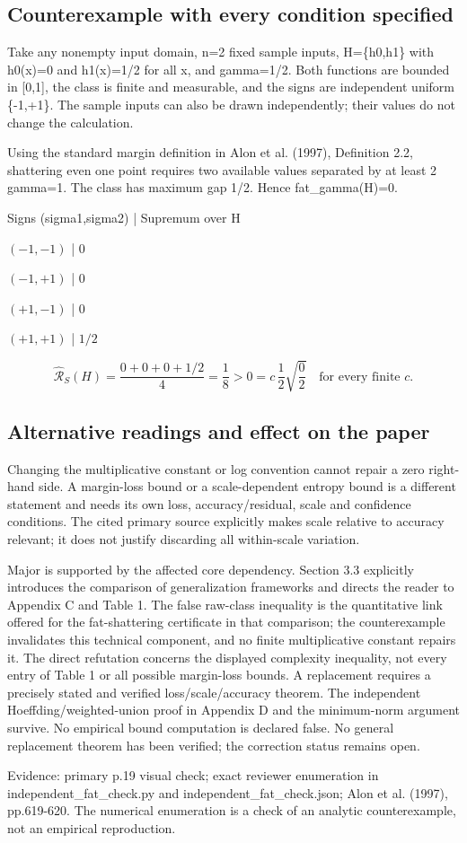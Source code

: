 \documentclass[10pt]{article}
\begin{document}
\subsection*{Counterexample with every condition specified}
Take any nonempty input domain, n=2 fixed sample inputs, H=\{h0,h1\} with h0(x)=0 and h1(x)=1/2 for all x, and gamma=1/2. Both functions are bounded in [0,1], the class is finite and measurable, and the signs are independent uniform \{-1,+1\}. The sample inputs can also be drawn independently; their values do not change the calculation.\par
Using the standard margin definition in Alon et al. (1997), Definition 2.2, shattering even one point requires two available values separated by at least 2 gamma=1. The class has maximum gap 1/2. Hence fat\_gamma(H)=0.\par
Signs (sigma1,sigma2) | Supremum over H\par
\((-1,-1)\) | \(0\)\par
\((-1,+1)\) | \(0\)\par
\((+1,-1)\) | \(0\)\par
\((+1,+1)\) | \(1/2\)\par
\[\widehat{\mathcal{R}}_S(H)=\frac{0+0+0+1/2}{4}=\frac18>0=c\,\frac12\sqrt{\frac02}\quad\text{for every finite }c.\]\par
\subsection*{Alternative readings and effect on the paper}
Changing the multiplicative constant or log convention cannot repair a zero right-hand side. A margin-loss bound or a scale-dependent entropy bound is a different statement and needs its own loss, accuracy/residual, scale and confidence conditions. The cited primary source explicitly makes scale relative to accuracy relevant; it does not justify discarding all within-scale variation.\par
Major is supported by the affected core dependency. Section 3.3 explicitly introduces the comparison of generalization frameworks and directs the reader to Appendix C and Table 1. The false raw-class inequality is the quantitative link offered for the fat-shattering certificate in that comparison; the counterexample invalidates this technical component, and no finite multiplicative constant repairs it. The direct refutation concerns the displayed complexity inequality, not every entry of Table 1 or all possible margin-loss bounds. A replacement requires a precisely stated and verified loss/scale/accuracy theorem. The independent Hoeffding/weighted-union proof in Appendix D and the minimum-norm argument survive. No empirical bound computation is declared false. No general replacement theorem has been verified; the correction status remains open.\par
Evidence: primary p.19 visual check; exact reviewer enumeration in independent\_fat\_check.py and independent\_fat\_check.json; Alon et al. (1997), pp.619-620. The numerical enumeration is a check of an analytic counterexample, not an empirical reproduction.\par
\end{document}
